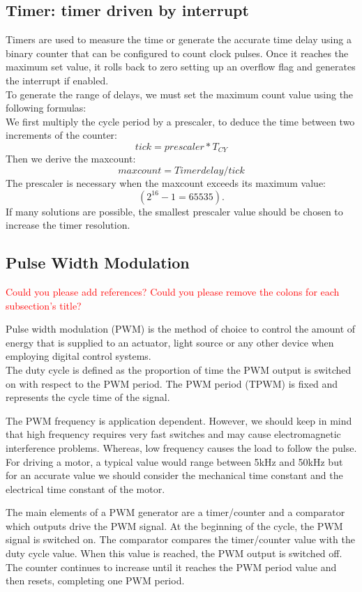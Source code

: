 \subsection{Timer: timer driven by interrupt}

Timers are used to measure the time or generate the accurate time delay using a binary counter that can be configured to count clock pulses. Once it reaches the maximum set value, it rolls back to zero setting up an overflow flag and generates the interrupt if enabled. \\

\noindent
To generate the range of delays, we must set the maximum count value using the following formulas:\\
We first multiply the cycle period by a prescaler, to deduce the time between two increments of the counter:
$$tick=prescaler*T_{CY}$$
Then we derive the maxcount:
$$maxcount=Timer delay/tick$$
The prescaler is necessary when the maxcount exceeds its maximum value: $$(2^{16}-1=65535).$$ 
If many solutions are possible, the smallest prescaler value should be chosen to increase the timer resolution. 

\subsection{Pulse Width Modulation} 

\textcolor{red}{Could you please add references?}
\textcolor{red}{Could you please remove the colons for each subsection's title?}

Pulse width modulation (PWM) is the method of choice to control the amount of energy that is supplied to an actuator, light source or any other device when employing digital control systems.\\
The duty cycle is defined as the proportion of time the PWM output is switched on with respect to the PWM period.
The PWM period (TPWM) is fixed and represents the cycle time of the signal.

The PWM frequency is application dependent. However, we should keep in mind that high frequency requires very fast switches and may cause electromagnetic interference problems. Whereas, low frequency causes the load to follow the pulse.\\
For driving a motor, a typical value would range between 5kHz and 50kHz but for an accurate value we should consider the mechanical time constant and the electrical time constant of the motor.

The main elements of a PWM generator are a timer/counter and a comparator which outputs drive the PWM signal. At the beginning of the cycle, the PWM signal is switched on. The comparator compares the timer/counter value with the duty cycle value. When this value is reached, the PWM output is switched off. The counter continues to increase until it reaches the PWM period value and then resets, completing one PWM period.

